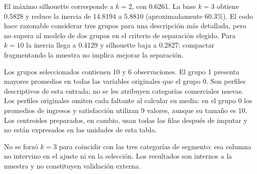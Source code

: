 \documentclass[11pt]{article}
\begin{document}
El máximo silhouette corresponde a \textbf{$k=2$}, con 0.6261.
La base $k=3$ obtiene 0.5828 y reduce la inercia de 14.8194 a 5.8810
(aproximadamente 60.3\%). El codo hace razonable considerar tres grupos
para una descripción más detallada, pero no supera al modelo de dos grupos
en el criterio de separación elegido. Para $k=10$ la inercia llega a
0.4129 y silhouette baja a 0.2827: compactar fragmentando la muestra no
implica mejorar la separación.

Los grupos seleccionados contienen 10 y 6 observaciones. El grupo 1
presenta mayores promedios en todas las variables originales que el grupo 0.
Son perfiles descriptivos de esta entrada; no se les atribuyen categorías
comerciales nuevas. Los perfiles originales omiten cada faltante al calcular
su media: en el grupo 0 los promedios de ingresos y satisfacción utilizan
9 valores, aunque su tamaño es 10. Los centroides preparados, en cambio,
usan todas las filas después de imputar y no están expresados en las unidades
de esta tabla.

No se forzó $k=3$ para coincidir con las tres categorías de segmento:
esa columna no intervino en el ajuste ni en la selección. Los resultados
son internos a la muestra y no constituyen validación externa.
\FloatBarrier
\clearpage
\end{document}
